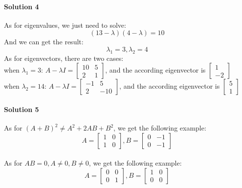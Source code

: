 \documentclass[paper=a4, fontsize=11pt]{scrartcl} %
\numberwithin{equation}{section} %
\numberwithin{figure}{section} %
\numberwithin{table}{section} %
\begin{document}
\paragraph{\textbf{Solution 4}}
As for eigenvalues, we just need to solve:
\begin{equation*}
(13-\lambda)(4-\lambda)=10
\end{equation*}
And we can get the result:
\begin{equation*}
\lambda _{1}=3, \lambda _{2}=4
\end{equation*}
As for eigenvectors, there are two cases:
\\ when $\lambda _{1}=3$: $A-\lambda I=\begin{bmatrix}
 10& 5\\
 2& 1
\end{bmatrix}$, and the according eigenvector is $\begin{bmatrix}
1\\-2
\end{bmatrix}$
\\ when $\lambda _{2}=14$: $A-\lambda I=\begin{bmatrix}
 -1& 5\\
 2& -10
\end{bmatrix}$, and the according eigenvector is $\begin{bmatrix}
5\\1
\end{bmatrix}$

\paragraph{\textbf{Solution 5}}
As for $\left ( A+B \right )^{2}\neq A^{2}+2AB+B^{2}$, we get the following example:
\begin{equation*}
A=\begin{bmatrix}
 1&0 \\
 1&0
\end{bmatrix}, B=\begin{bmatrix}
 0&-1 \\
 0&-1
\end{bmatrix}
\end{equation*}
\\ As for $AB=0, A\neq 0, B\neq 0$, we get the following example:
\begin{equation*}A=\begin{bmatrix}
 0&0 \\
 0&1
\end{bmatrix}, B=\begin{bmatrix}
 1&0 \\
 0&0
\end{bmatrix}
\end{equation*}
\end{document}
